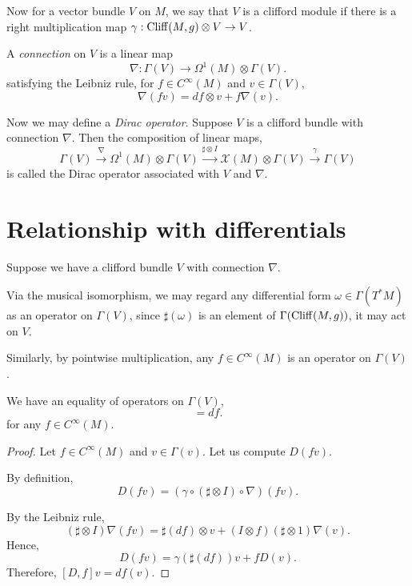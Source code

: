 Now for a vector bundle $V$ on $M$, we say that $V$ is a clifford module
if there is a right multiplication map $\gamma:\operatorname{Cliff}(M,g) \otimes V\rightarrow V$. 

A \emph{connection} on $V$ is a linear map
\begin{equation}
    \nabla:\Gamma(V)\rightarrow \Omega^1(M)\otimes \Gamma(V).
\end{equation}
satisfying the Leibniz rule, for $f \in C^\infty(M)$ and $v \in \Gamma(V)$,
\begin{equation}
    \nabla(fv) = df \otimes v +f\nabla(v).
\end{equation}

Now we may define a \emph{Dirac operator}. Suppose $V$
is a clifford bundle with connection $\nabla$. Then the composition of linear maps,
\begin{equation}
    \Gamma(V) \xrightarrow{\nabla} \Omega^1(M) \otimes \Gamma(V) \xrightarrow{\sharp\otimes I} \mathcal{X}(M)\otimes \Gamma(V) \xrightarrow{\gamma} \Gamma(V)
\end{equation}
is called the Dirac operator associated with $V$ and $\nabla$. 

\section{Relationship with differentials}
Suppose we have a clifford bundle $V$ with connection $\nabla$. 

Via the musical isomorphism, we may regard any differential form $\omega \in \Gamma(T^*M)$
as an operator on $\Gamma(V)$, since $\sharp(\omega)$ is an element of $\Gamma(\operatorname{Cliff}(M,g))$,
it may act on $V$.

Similarly, by pointwise multiplication, any $f \in C^\infty(M)$ is an operator
on $\Gamma(V)$. 
\begin{theorem}
    We have an equality of operators on $\Gamma(V)$,
    \begin{equation}
        [D,f] = df.
    \end{equation}
    for any $f \in C^\infty(M)$.
\end{theorem}
\begin{proof}
    Let $f \in C^\infty(M)$ and $v \in \Gamma(v)$. Let 
    us compute $D(fv)$.
    
    By definition,
    \begin{equation}
        D(fv) = (\gamma\circ(\sharp\otimes I)\circ\nabla)(fv).
    \end{equation}
    
    By the Leibniz rule,
    \begin{equation}
        (\sharp\otimes I)\nabla(fv) = \sharp(df)\otimes v + (I\otimes f)(\sharp \otimes 1)\nabla(v).
    \end{equation}
    Hence,
    \begin{equation}
        D(fv) = \gamma(\sharp(df))v + fD(v).
    \end{equation}
    Therefore, $[D,f]v = df(v)$.
\end{proof}
